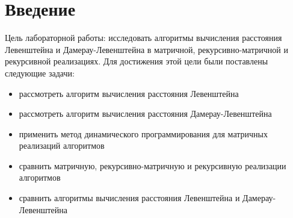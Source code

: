 \section*{Введение}
Цель лабораторной работы: исследовать алгоритмы вычисления расстояния Левенштейна и Дамерау-Левенштейна в матричной, рекурсивно-матричной и рекурсивной реализациях.
Для достижения этой цели были поставлены следующие задачи:\\
\begin{itemize}
\item рассмотреть алгоритм вычисления расстояния Левенштейна
\item рассмотреть алгоритм вычисления расстояния Дамерау-Левенштейна
\item применить метод динамического программирования для матричных реализаций алгоритмов
\item сравнить матричную, рекурсивно-матричную и рекурсивную реализации алгоритмов
\item сравнить алгоритмы вычисления расстояния Левенштейна и Дамерау-Левенштейна
\end{itemize}
\newpage